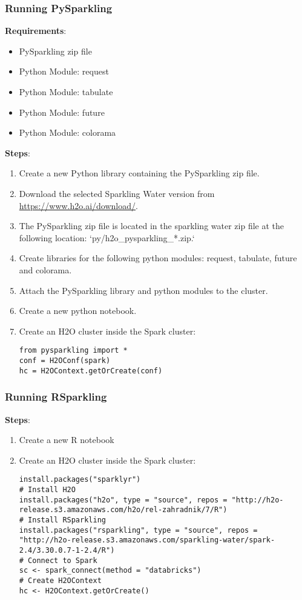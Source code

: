 \subsubsection{Running PySparkling}

\textbf{Requirements}:
\begin{itemize}
\item PySparkling zip file
\item Python Module: request
\item Python Module: tabulate
\item Python Module: future
\item Python Module: colorama
\end{itemize}

\textbf{Steps}:
\begin{enumerate}
\item Create a new Python library containing the PySparkling zip file.
\item Download the selected Sparkling Water version from \url{https://www.h2o.ai/download/}.
\item The PySparkling zip file is located in the sparkling water zip file at the following location: `py/h2o\_pysparkling\_*.zip.`
\item Create libraries for the following python modules: request, tabulate, future and colorama.
\item Attach the PySparkling library and python modules to the cluster.
\item Create a new python notebook.
\item Create an H2O cluster inside the Spark cluster:
\begin{lstlisting}[style=Python]
from pysparkling import *
conf = H2OConf(spark)
hc = H2OContext.getOrCreate(conf)
\end{lstlisting}

\end{enumerate}

\subsubsection{Running RSparkling}

\textbf{Steps}:
\begin{enumerate}
  \item Create a new R notebook
  \item Create an H2O cluster inside the Spark cluster:
  \begin{lstlisting}[style=R]
install.packages("sparklyr")
# Install H2O
install.packages("h2o", type = "source", repos = "http://h2o-release.s3.amazonaws.com/h2o/rel-zahradnik/7/R")
# Install RSparkling
install.packages("rsparkling", type = "source", repos = "http://h2o-release.s3.amazonaws.com/sparkling-water/spark-2.4/3.30.0.7-1-2.4/R")
# Connect to Spark
sc <- spark_connect(method = "databricks")
# Create H2OContext
hc <- H2OContext.getOrCreate()
  \end{lstlisting}

\end{enumerate}